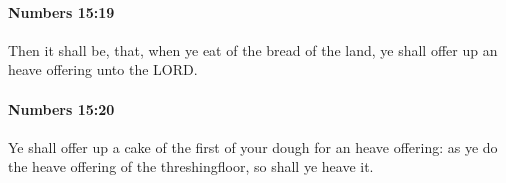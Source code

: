 		\paragraph{Numbers 15:19} %
			\label{NUMBERS-15-19}

			Then it shall be, that, when ye eat of the bread of the land, ye shall offer up an heave offering unto the LORD.


		\paragraph{Numbers 15:20} %
			\label{NUMBERS-15-20}

			Ye shall offer up a cake of the first of your dough for an heave offering: as ye do the heave offering of the threshingfloor, so shall ye heave it.


